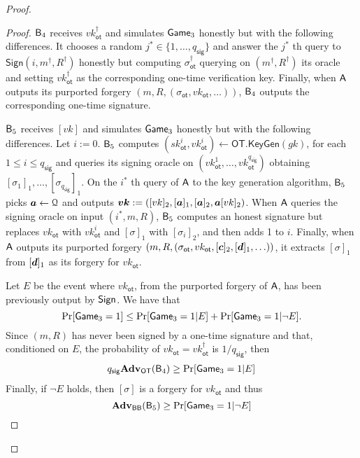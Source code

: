 \begin{proof}
\begin{proof}
$\mathsf{B}_4$ receives $vk_\mathsf{ot}^\dag$ and simulates $\mathsf{Game}_3$ honestly but with the following differences. It chooses a random $j^*\in\{1,\ldots, q_\mathsf{sig}\}$ and answer the $j^*$ th query to $\mathsf{Sign}(i,m^\dag,R^\dag)$ honestly but computing $\sigma_\mathsf{ot}^\dag$ querying on $(m^\dag,R^\dag)$ its oracle and setting $vk_\mathsf{ot}^\dag$ as the corresponding one-time verification key. Finally, when $\mathsf{A}$ outputs its purported forgery $(m,R,(\sigma_\mathsf{ot},vk_\mathsf{ot},\ldots))$, $\mathsf{B}_4$ outputs the corresponding one-time signature.

$\mathsf{B}_5$ receives $[vk]$ and simulates $\mathsf{Game}_3$ honestly but with the following differences. Let $i:=0$. $\mathsf{B}_5$ computes $(sk_\mathsf{ot}^i,vk_\mathsf{ot}^i)\gets\mathsf{OT}.\mathsf{KeyGen}(gk)$, for each $1\leq i\leq q_\mathsf{sig}$ and queries its signing oracle on $(vk_{\mathsf{ot}}^1,\ldots,vk_\mathsf{ot}^{q_{\mathsf{sig}}})$ obtaining $[\sigma_1]_1,\ldots,[\sigma_{q_\mathsf{sig}}]_1$. On the $i^*$ th query of $\mathsf{A}$ to the key generation algorithm, $\mathsf{B}_5$ picks ${\boldsymbol{a}}\gets\mathcal{Q}$ and outputs ${\boldsymbol{vk}}:=([vk]_2,[{\boldsymbol{a}}]_1,[{\boldsymbol{a}}]_2,{\boldsymbol{a}}[vk]_2)$. When $\mathsf{A}$ queries the signing oracle on input $(i^*,m,R)$, $\mathsf{B}_5$ computes an honest signature but replaces $vk_\mathsf{ot}$ with $vk_\mathsf{ot}^i$ and $[\sigma]_1$ with $[\sigma_i]_2$, and then adds 1 to $i$. Finally, when $\mathsf{A}$ outputs its purported forgery $(m,R,(\sigma_\mathsf{ot},vk_\mathsf{ot},[{\boldsymbol{c}}]_2,[{\boldsymbol{d}}]_1,\ldots))$, it extracts $[\sigma]_1$ from $[{\boldsymbol{d}}]_1$ as its forgery for $vk_\mathsf{ot}$.

Let $E$ be the event where $vk_\mathsf{ot}$, from the purported forgery of $\mathsf{A}$, has been previously output by $\mathsf{Sign}$. We have that
$$
\Pr[\mathsf{Game}_3=1]\leq \Pr[\mathsf{Game}_3=1|E]+\Pr[\mathsf{Game}_3=1|\neg E].
$$
Since  $(m,R)$ has never been signed by a one-time signature and that, conditioned on $E$, the probability of $vk_\mathsf{ot}=vk_\mathsf{ot}^\dag$ is $1/q_\mathsf{sig}$, then
\begin{align*}
q_{\mathsf{sig}}\mathbf{Adv}_\mathsf{OT}(\mathsf{B}_4)\geq  \Pr[\mathsf{Game}_3=1|E]
\end{align*}
Finally, if $\neg E$ holds, then $[\sigma]$ is a forgery for $vk_\mathsf{ot}$ and thus
$$
\mathbf{Adv}_{\mathsf{BB}}(\mathsf{B}_5)\geq \Pr[\mathsf{Game}_3=1|\neg E]$$
\end{proof}
\end{proof}
